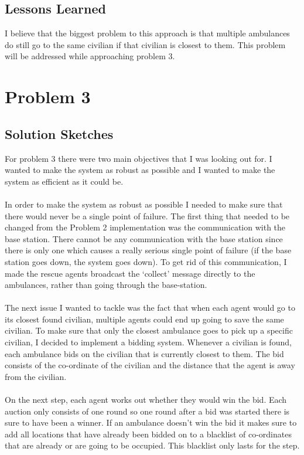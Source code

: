 \documentclass[titlepage]{article}
\begin{document}
  \subsection{Lessons Learned}
    I believe that the biggest problem to this approach is that multiple ambulances do still go to the same civilian if that civilian is closest to them. This problem will be addressed while approaching problem 3.

\section{Problem 3}
  \subsection{Solution Sketches}
    For problem 3 there were two main objectives that I was looking out for. I wanted to make the system as robust as possible and I wanted to make the system as efficient as it could be.
    \\ \\
    In order to make the system as robust as possible I needed to make sure that there would never be a single point of failure. The first thing that needed to be changed from the Problem 2 implementation was the communication with the base station. There cannot be any communication with the base station since there is only one which causes a really serious single point of failure (if the base station goes down, the system goes down). To get rid of this communication, I made the rescue agents broadcast the `collect' message directly to the ambulances, rather than going through the base-station.
    \\ \\
    The next issue I wanted to tackle was the fact that when each agent would go to its closest found civilian, multiple agents could end up going to save the same civilian. To make sure that only the closest ambulance goes to pick up a specific civilian, I decided to implement a bidding system. Whenever a civilian is found, each ambulance bids on the civilian that is currently closest to them. The bid consists of the co-ordinate of the civilian and the distance that the agent is away from the civilian.
    \\ \\
    On the next step, each agent works out whether they would win the bid. Each auction only consists of one round so one round after a bid was started there is sure to have been a winner. If an ambulance doesn't win the bid it makes sure to add all locations that have already been bidded on to a blacklist of co-ordinates that are already or are going to be occupied. This blacklist only lasts for the step. 
\end{document}
